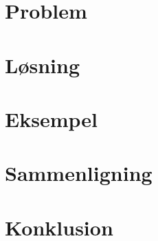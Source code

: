 \section{Problem}

\section{Løsning}

\section{Eksempel}

\section{Sammenligning}

\section{Konklusion}